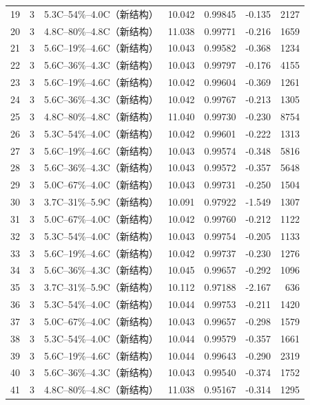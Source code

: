 \begin{longtable}{rrlrrrr}
19 & 3 & 5.3C--54\%--4.0C（新结构） & 10.042 & 0.99845 & -0.135 & 2127 \\
20 & 3 & 4.8C--80\%--4.8C（新结构） & 11.038 & 0.99771 & -0.216 & 1659 \\
21 & 3 & 5.6C--19\%--4.6C（新结构） & 10.043 & 0.99582 & -0.368 & 1234 \\
22 & 3 & 5.6C--36\%--4.3C（新结构） & 10.043 & 0.99797 & -0.176 & 4155 \\
23 & 3 & 5.6C--19\%--4.6C（新结构） & 10.042 & 0.99604 & -0.369 & 1261 \\
24 & 3 & 5.6C--36\%--4.3C（新结构） & 10.042 & 0.99767 & -0.213 & 1305 \\
25 & 3 & 4.8C--80\%--4.8C（新结构） & 11.040 & 0.99730 & -0.230 & 8754 \\
26 & 3 & 5.3C--54\%--4.0C（新结构） & 10.042 & 0.99601 & -0.222 & 1313 \\
27 & 3 & 5.6C--19\%--4.6C（新结构） & 10.043 & 0.99574 & -0.348 & 5816 \\
28 & 3 & 5.6C--36\%--4.3C（新结构） & 10.043 & 0.99572 & -0.357 & 5648 \\
29 & 3 & 5.0C--67\%--4.0C（新结构） & 10.043 & 0.99731 & -0.250 & 1504 \\
30 & 3 & 3.7C--31\%--5.9C（新结构） & 10.091 & 0.97922 & -1.549 & 1307 \\
31 & 3 & 5.0C--67\%--4.0C（新结构） & 10.042 & 0.99760 & -0.212 & 1122 \\
32 & 3 & 5.3C--54\%--4.0C（新结构） & 10.043 & 0.99754 & -0.205 & 1133 \\
33 & 3 & 5.6C--19\%--4.6C（新结构） & 10.042 & 0.99737 & -0.230 & 1276 \\
34 & 3 & 5.6C--36\%--4.3C（新结构） & 10.045 & 0.99657 & -0.292 & 1096 \\
35 & 3 & 3.7C--31\%--5.9C（新结构） & 10.112 & 0.97188 & -2.167 & 636 \\
36 & 3 & 5.3C--54\%--4.0C（新结构） & 10.044 & 0.99753 & -0.211 & 1420 \\
37 & 3 & 5.0C--67\%--4.0C（新结构） & 10.043 & 0.99657 & -0.298 & 1579 \\
38 & 3 & 5.3C--54\%--4.0C（新结构） & 10.044 & 0.99579 & -0.357 & 1661 \\
39 & 3 & 5.6C--19\%--4.6C（新结构） & 10.044 & 0.99643 & -0.290 & 2319 \\
40 & 3 & 5.6C--36\%--4.3C（新结构） & 10.043 & 0.99540 & -0.374 & 1752 \\
41 & 3 & 4.8C--80\%--4.8C（新结构） & 11.038 & 0.95167 & -0.314 & 1295 \\

\end{longtable}

